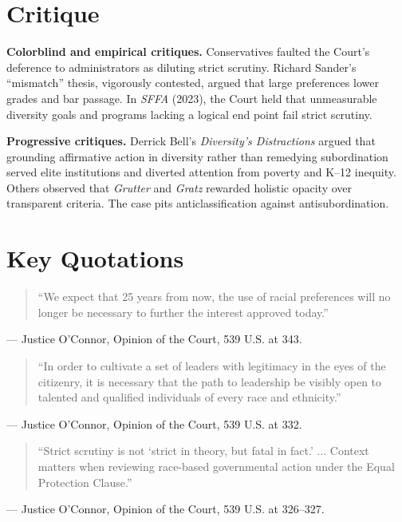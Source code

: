 \documentclass[12pt]{article}
\begin{document}
\section{Critique}

\textbf{Colorblind and empirical critiques.} Conservatives faulted the Court's deference to administrators as diluting strict scrutiny. Richard Sander's ``mismatch'' thesis, vigorously contested, argued that large preferences lower grades and bar passage. In \textit{SFFA} (2023), the Court held that unmeasurable diversity goals and programs lacking a logical end point fail strict scrutiny.

\textbf{Progressive critiques.} Derrick Bell's \textit{Diversity's Distractions} argued that grounding affirmative action in diversity rather than remedying subordination served elite institutions and diverted attention from poverty and K--12 inequity. Others observed that \textit{Grutter} and \textit{Gratz} rewarded holistic opacity over transparent criteria. The case pits anticlassification against antisubordination.

\section{Key Quotations}

\begin{quote}
``We expect that 25 years from now, the use of racial preferences will no longer be necessary to further the interest approved today.''
\end{quote}
\noindent --- Justice O'Connor, Opinion of the Court, 539 U.S. at 343.

\begin{quote}
``In order to cultivate a set of leaders with legitimacy in the eyes of the citizenry, it is necessary that the path to leadership be visibly open to talented and qualified individuals of every race and ethnicity.''
\end{quote}
\noindent --- Justice O'Connor, Opinion of the Court, 539 U.S. at 332.

\begin{quote}
``Strict scrutiny is not `strict in theory, but fatal in fact.' ... Context matters when reviewing race-based governmental action under the Equal Protection Clause.''
\end{quote}
\noindent --- Justice O'Connor, Opinion of the Court, 539 U.S. at 326--327.
\end{document}
